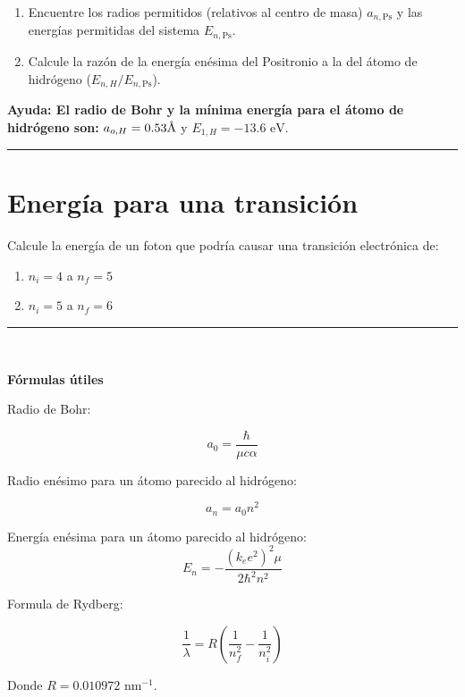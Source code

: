 \documentclass[12pt]{article}
\newcommand{\angstrom}{\mbox{\normalfont\AA}}
\begin{document}
\begin{enumerate}
	\item Encuentre los radios permitidos (relativos al centro de masa) $a_{n,\text{Ps}}$ y las
	energías permitidas del sistema $E_{n,\text{Ps}}$.
	\item Calcule la razón de la energía enésima del Positronio a la del átomo de hidrógeno ($E_{n,H}/E_{n,\text{Ps}}$).
\end{enumerate}

\textbf{Ayuda: El radio de Bohr y la mínima energía  para el átomo de hidrógeno son:} $a_{o,H} = 0.53 \angstrom$ y  $E_{1,H} = -13.6 \text{ eV}$.

\noindent\rule{16.5cm}{0.4pt}

\section{Energía para una transición}

Calcule la energía de un foton que podría causar una transición electrónica de:


\begin{enumerate}[label=\alph*)]
	\item $n_i = 4$ a $n_f = 5$ 
	\item $n_i = 5$ a $n_f = 6$
\end{enumerate}



\noindent\rule{16.5cm}{0.4pt}
\\
\begin{center}
\textbf{Fórmulas útiles}
\end{center}



Radio de Bohr:

\begin{equation*}
a_0 = \frac{\hbar}{\mu c \alpha}
\end{equation*}

Radio enésimo para un átomo parecido al hidrógeno:

\begin{equation*}
a_n = a_0 n^2
\end{equation*}

Energía enésima para un átomo parecido al hidrógeno:
\begin{equation}
E_n = -\frac{(k_e e^2)^2 \mu }{2 \hbar^2 n^2}
\end{equation}

Formula de Rydberg:

\begin{equation*}
\frac{1}{\lambda} = R\left(\frac{1}{n_f^2}-\frac{1}{n_i^2}\right)
\end{equation*}

Donde $R = 0.010972$ nm$^{-1}$.
\end{document}
